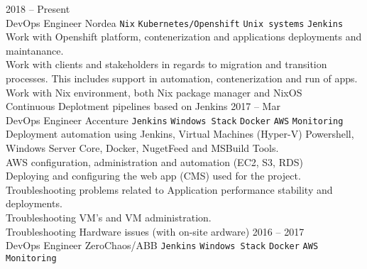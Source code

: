 \documentclass[9pt]{style/developercv}
\begin{document}
\vspace{0.75cm}



\begin{entrylist}
	\entry
	    {2018 -- Present\\\footnotesize{DevOps Engineer}}
		{Nordea}
		{
			\texttt{Nix}\slashsep
			\texttt{Kubernetes/Openshift}\slashsep
			\texttt{Unix systems}\slashsep
			\texttt{Jenkins}\\

			Work with Openshift platform, contenerization and applications deployments and maintanance. \\
			Work with clients and stakeholders in regards to migration and transition processes. This includes support in automation, contenerization and run of apps. \\
			Work with Nix environment, both Nix package manager and NixOS \\
			Continuous Deplotment pipelines based on Jenkins
		}
	\entry
		{2017 -- Mar\\\footnotesize{DevOps Engineer}}
		{Accenture}
		{
			\texttt{Jenkins}\slashsep
			\texttt{Windows Stack}\slashsep
			\texttt{Docker}\slashsep
			\texttt{AWS}\slashsep
			\texttt{Monitoring}\\
 
 			Deployment automation using Jenkins, Virtual Machines (Hyper-V) Powershell, Windows Server Core, Docker, NugetFeed and MSBuild Tools.\\ 
 			AWS configuration, administration and automation (EC2, S3, RDS)\\
 			Deploying and configuring the web app (CMS) used for the project.\\
			Troubleshooting problems related to Application performance stability and deployments.\\
			Troubleshooting VM's and VM administration.\\
			Troubleshooting Hardware issues (with on-site ardware)
		}
	\entry
		{2016 -- 2017\\\footnotesize{DevOps Engineer}}
		{ZeroChaos/ABB}
		{
			\texttt{Jenkins}\slashsep
			\texttt{Windows Stack}\slashsep
			\texttt{Docker}\slashsep
			\texttt{AWS}\slashsep
			\texttt{Monitoring}\\

}
\end{entrylist}
\end{document}

